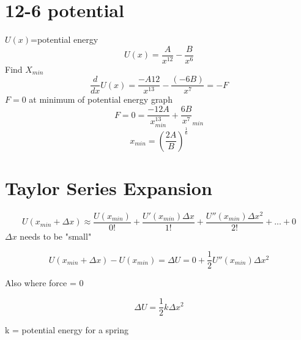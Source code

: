 \documentclass[fleqn]{article}
\begin{document}
\setlength{\mathindent}{0pt}
\section*{12-6 potential}
$U(x)$=potential energy
\[ U(x)=\frac{A}{x^{12}} -\frac{B}{x^6}  \]
Find $X_{min}$
\[ \frac{d}{dx} U(x) =\frac{-A12}{x^{13}}-\frac{(-6B)}{x^7}  =-F\]
$F=0$ at minimum of potential energy graph
\[ F=0=\frac{-12A}{x^{13}_{min} } +\frac{6B}{x^7}_{min}   \]
\[ x_{min}=\left(\frac{2A}{B}\right) ^\frac{1}{6}  \]

\section*{Taylor Series Expansion}
\[ U(x _{min} + \Delta x) \approx \frac{ U(x _{min} )}{0!} + \frac {U'(x _{min} )\Delta x}{1!}+\frac{U''(x _{min} )\Delta x^2}{2!} + ... + 0 \]
$\Delta x$ needs to be "small"

\[ U(x _{min} +\Delta x) - U(x _{min} )=\Delta U =0 + \frac{1}{2} U''(x _{min} )\Delta x^2\]

Also where force = 0

\[ \Delta U=\frac{1}{2} k \Delta x^2 \]

k = potential energy for a spring
\end{document}
